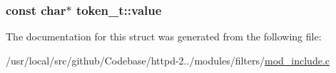 \subsubsection[{\texorpdfstring{value}{value}}]{\setlength{\rightskip}{0pt plus 5cm}const char$\ast$ token\+\_\+t\+::value}\hypertarget{structtoken__t_a1de7b234da1e01241f78e3e9da953198}{}\label{structtoken__t_a1de7b234da1e01241f78e3e9da953198}


The documentation for this struct was generated from the following file\+:\begin{DoxyCompactItemize}
\item 
/usr/local/src/github/\+Codebase/httpd-\/2../modules/filters/\hyperlink{mod__include_8c}{mod\+\_\+include.\+c}\end{DoxyCompactItemize}
